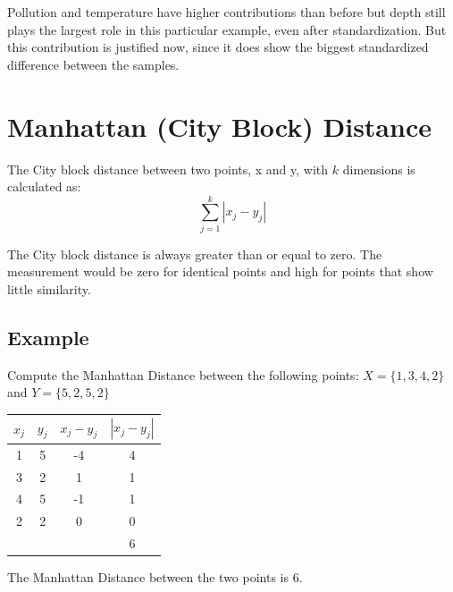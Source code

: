 \documentclass[a4paper,12pt]{article}
\begin{document}
Pollution and temperature have higher contributions than before but depth still plays the
largest role in this particular example, even after standardization. But this contribution is
justified now, since it does show the biggest standardized difference between the samples. 
\newpage
\section{Manhattan (City Block) Distance}
The City block distance between two points, x and y, with $k$ dimensions is calculated as:
\[ \sum^{k}_{j=1} | x_j - y_j |  \]

The City block distance is always greater than or equal to zero. The measurement would be zero for identical points and high for points that show little similarity.

\subsection{Example}
Compute the Manhattan Distance between the following points: 
$X = \{1,3,4,2\}$ and $Y = \{5,2,5,2\}$


\begin{center}
\begin{tabular}{|c|c|c|c|}
  \hline
$x_j$	&	$y_j$	&   $x_j - y_j$	&	$| x_j - y_j |$	\\ \hline
1	&	5	&	-4	&	4	\\
3	&	2	&	1	&	1	\\
4	&	5	&	-1	&	1	\\
2	&	2	&	0	&	0	\\ \hline
& & & 6 \\
  \hline
\end{tabular}
\end{center}
The Manhattan Distance between the two points is 6.

\newpage
\end{document}
